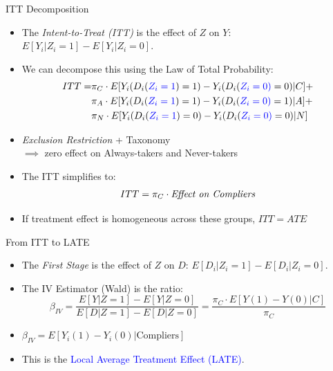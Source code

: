 \documentclass[11pt, handout]{beamer}
\begin{document}
\begin{frame}{ITT Decomposition}
    \begin{itemize}[<+->]
        \item The \textit{Intent-to-Treat (ITT)} is the effect of $Z$ on $Y$: $E[Y_i | Z_i=1] - E[Y_i | Z_i=0]$.
        \vspace{0.8em}
        \item We can decompose this using the Law of Total Probability:
        \begin{equation*}
            \begin{aligned}
                ITT = &\pi_C \cdot E[Y_i(D_{i}(\textcolor{blue}{Z_{i} = 1}) = 1) - Y_i(D_{i}(\textcolor{blue}{Z_{i} = 0)} = 0) | C] + \\
                      &\pi_A \cdot E[Y_i(D_{i}(\textcolor{blue}{Z_{i} = 1}) = 1) - Y_i(D_{i}(\textcolor{blue}{Z_{i} = 0)} = 1) | A] + \\ 
                      &\pi_N \cdot E[Y_i(D_{i}(\textcolor{blue}{Z_{i} = 1}) = 0) - Y_i(D_{i}(\textcolor{blue}{Z_{i} = 0)} = 0) | N]
            \end{aligned}
        \end{equation*}
        \vspace{0.8em}
        \item \textit{Exclusion Restriction} + Taxonomy \\ $\implies$ zero effect on Always-takers and Never-takers
        \vspace{0.8em}
        \item The ITT simplifies to:
        \begin{equation*}
            ITT = \pi_C \cdot \text{\textit{Effect on Compliers}}
        \end{equation*}
        \item If treatment effect is homogeneous across these groups, $ITT = ATE$
    \end{itemize}
\end{frame}

\begin{frame}{From ITT to LATE}
    \begin{itemize}[<+->]
        \item The \textit{First Stage} is the effect of $Z$ on $D$: $E[D_i | Z_i=1] - E[D_i | Z_i=0]$.
        \vspace{0.8em}
        \item The IV Estimator (Wald) is the ratio:
        \begin{equation*}
            \beta_{IV} = \frac{E[Y|Z=1] - E[Y|Z=0]}{E[D|Z=1] - E[D|Z=0]} = \frac{\pi_C \cdot E[Y(1)-Y(0)|C]}{\pi_C}
        \end{equation*}
        \vspace{0.8em}
        \item $\beta_{IV} = E[Y_i(1) - Y_i(0) | \text{Compliers}]$
        \vspace{0.8em}
        \item This is the \textcolor{blue}{Local Average Treatment Effect (LATE)}.
    \end{itemize}
\end{frame}
\end{document}
